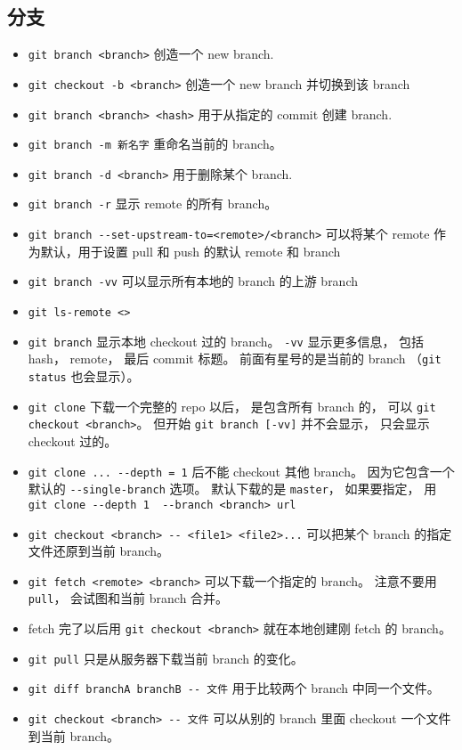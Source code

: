 \subsection{分支}
\begin{itemize}
\item \verb`git branch <branch>` 创造一个 new branch.
\item \verb`git checkout -b <branch>` 创造一个 new branch 并切换到该 branch
\item \verb`git branch <branch> <hash>` 用于从指定的 commit 创建 branch.
\item \verb`git branch -m 新名字` 重命名当前的 branch。
\item \verb`git branch -d <branch>` 用于删除某个 branch.
\item \verb`git branch -r` 显示 remote 的所有 branch。
\item \verb`git branch --set-upstream-to=<remote>/<branch>` 可以将某个 remote 作为默认，用于设置 pull 和 push 的默认 remote 和 branch
\item \verb`git branch -vv` 可以显示所有本地的 branch 的上游 branch
\item \verb`git ls-remote <>`
\item \verb`git branch` 显示本地 checkout 过的 branch。 \verb`-vv` 显示更多信息， 包括 hash， remote， 最后 commit 标题。 前面有星号的是当前的 branch （\verb`git status` 也会显示）。
\item \verb`git clone` 下载一个完整的 repo 以后， 是包含所有 branch 的， 可以 \verb`git checkout <branch>`。 但开始 \verb`git branch [-vv]` 并不会显示， 只会显示 checkout 过的。
\item \verb`git clone ... --depth = 1` 后不能 checkout 其他 branch。 因为它包含一个默认的 \verb`--single-branch` 选项。 默认下载的是 \verb`master`， 如果要指定， 用 \verb`git clone --depth 1  --branch <branch> url`
\item \verb`git checkout <branch> -- <file1> <file2>...` 可以把某个 branch 的指定文件还原到当前 branch。
\item \verb`git fetch <remote> <branch>` 可以下载一个指定的 branch。 注意不要用 \verb`pull`， 会试图和当前 branch 合并。
\item fetch 完了以后用 \verb`git checkout <branch>` 就在本地创建刚 fetch 的 branch。
\item \verb`git pull` 只是从服务器下载当前 branch 的变化。
\item \verb`git diff branchA branchB -- 文件` 用于比较两个 branch 中同一个文件。
\item \verb`git checkout <branch> -- 文件` 可以从别的 branch 里面 checkout 一个文件到当前 branch。


\end{itemize}
